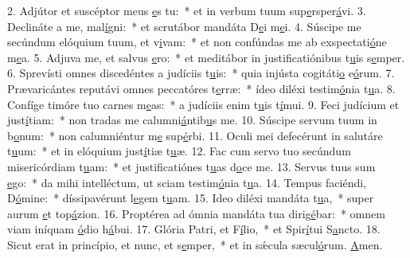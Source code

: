 2. Adjútor et suscéptor meus \uline{e}s tu:~* et in verbum tuum sup\uline{e}rsper\uline{á}vi.
3. Declináte a me, mal\uline{í}gni:~* et scrutábor mandáta D\uline{e}i m\uline{e}i.
4. Súscipe me secúndum elóquium tuum, et v\uline{i}vam:~* et non confúndas me ab exspectati\uline{ó}ne m\uline{e}a.
5. Adjuva me, et salvus \uline{e}ro:~* et meditábor in justificatiónibus t\uline{u}is s\uline{e}mper.
6. Sprevísti omnes discedéntes a judíciis t\uline{u}is:~* quia injústa cogitáti\uline{o} e\uline{ó}rum.
7. Prævaricántes reputávi omnes peccatóres t\uline{e}rræ:~* ídeo diléxi testim\uline{ó}nia t\uline{u}a.
8. Confíge timóre tuo carnes m\uline{e}as:~* a judíciis enim t\uline{u}is t\uline{í}mui.
9. Feci judícium et just\uline{í}tiam:~* non tradas me calumni\uline{á}ntib\uline{u}s me.
10. Súscipe servum tuum in b\uline{o}num:~* non calumniéntur m\uline{e} sup\uline{é}rbi.
11. Oculi mei defecérunt in salutáre t\uline{u}um:~* et in elóquium just\uline{í}tiæ t\uline{u}æ.
12. Fac cum servo tuo secúndum misericórdiam t\uline{u}am:~* et justificatiónes t\uline{u}as d\uline{o}ce me.
13. Servus tuus sum \uline{e}go:~* da mihi intelléctum, ut sciam testim\uline{ó}nia t\uline{u}a.
14. Tempus faciéndi, D\uline{ó}mine:~* díssipavérunt l\uline{e}gem t\uline{u}am.
15. Ideo diléxi mandáta t\uline{u}a,~* super aurum \uline{e}t top\uline{á}zion.
16. Proptérea ad ómnia mandáta tua dirig\uline{é}bar:~* omnem viam iníquam \uline{ó}dio h\uline{á}bui.
17. Glória Patri, et F\uline{í}lio,~* et Spir\uline{í}tui S\uline{a}ncto.
18. Sicut erat in princípio, et nunc, et s\uline{e}mper,~* et in sǽcula sæcul\uline{ó}rum. \uline{A}men.
